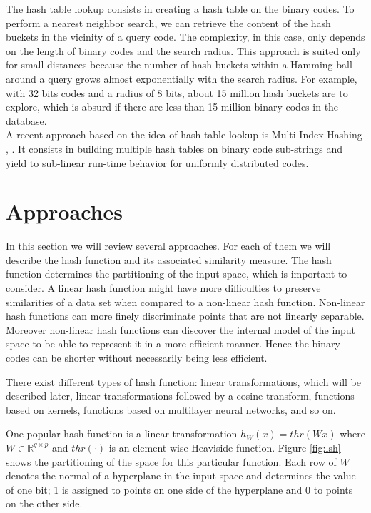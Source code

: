 The hash table lookup consists in creating a hash table on the binary codes. To perform a nearest neighbor search, we can retrieve the content of the hash buckets in the vicinity of a query code. The complexity, in this case, only depends on the length of binary codes and the search radius. This approach is suited only for small distances because the number of hash buckets within a Hamming ball around a query grows almost exponentially with the search radius. For example, with 32 bits codes and a radius of 8 bits, about 15 million hash buckets are to explore, which is absurd if there are less than 15 million binary codes in the database. \\
A recent approach based on the idea of hash table lookup is Multi Index Hashing \cite{norouzi2012fast}, \cite{norouzi2016}. It consists in building multiple hash tables on binary code sub-strings and yield to sub-linear run-time behavior for uniformly distributed codes.

\section{Approaches}
In this section we will review several approaches. For each of them we will describe the hash function and its associated similarity measure. The hash function determines the partitioning of the input space, which is important to consider. A linear hash function might have more difficulties to preserve similarities of a data set when compared to a non-linear hash function. Non-linear hash functions can more finely discriminate points that are not linearly separable. Moreover non-linear hash functions can discover the internal model of the input space to be able to represent it in a more efficient manner. Hence the binary codes can be shorter without necessarily being less efficient.

There exist different types of hash function: linear transformations, which will be described later, linear transformations followed by a cosine transform, functions based on kernels, functions based on multilayer neural networks, and so on.

One popular hash function is a linear transformation $h_W(x)=thr(Wx)$ where $W\in\mathbb{R}^{q\times{}p}$ and $thr(\cdot)$ is an element-wise Heaviside function. Figure \ref{fig:lsh} shows the partitioning of the space for this particular function. Each row of $W$ denotes the normal of a hyperplane in the input space and determines the value of one bit; 1 is assigned to points on one side of the hyperplane and 0 to points on the other side.

